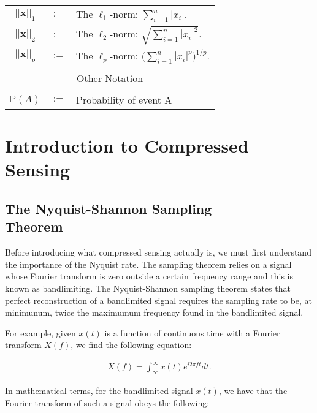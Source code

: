 \documentclass[titlepage,oneside, 12pt]{book}
\theoremstyle{break}
\begin{document}
\begin{table}[htbp]
\begin{center}
\begin{tabular}{c c p{10cm} }
$||\textbf{x}||_1 $ & $:=$ &The $\ell_1$-norm: $\sum_{i=1}^{n}|x_i|$.\\
$||\textbf{x}||_2 $ & $:=$ &The $\ell_2$-norm: $\sqrt{\sum_{i=1}^{n}|x_i|^2}$.\\
$||\textbf{x}||_p $ & $:=$ &The $\ell_p$-norm: $\bigg(\sum_{i=1}^{n}|x_i|^{p}\bigg)^{1/p}$.\\
\multicolumn{3}{c}{}\\
\multicolumn{3}{c}{\underline{Other Notation}}\\
\multicolumn{3}{c}{}\\
$\mathbb{P}(A)$ & $:=$ & Probability of event A\\

\bottomrule
\end{tabular}
\end{center}
\label{tab:TableOfNotationForMyResearch}
\end{table}


\chapter{Introduction to Compressed Sensing}

\section{The Nyquist-Shannon Sampling \protect\\ Theorem}

Before introducing what compressed sensing actually is, we must first understand the importance of the Nyquist rate. The sampling theorem relies on a signal whose Fourier transform is zero outside a certain frequency range and this is known as bandlimiting. The Nyquist-Shannon sampling theorem states that perfect reconstruction  of a bandlimited signal requires the sampling rate to be, at minimunum, twice the maximumum frequency found in the bandlimited signal.\cite{NyquistWiki} 

For example, given $x(t)$ is a function of continuous time with a Fourier transform $X(f)$, we find the following equation: 

\begin{equation} 
\begin{gathered}
X(f) = \int_{\infty}^{\infty} x(t) e^{i 2 \pi f t} dt.
\end{gathered}
\end{equation}

In mathematical terms, for the bandlimited signal $x(t)$, we have that the Fourier transform of such a signal obeys the following:
\end{document}
